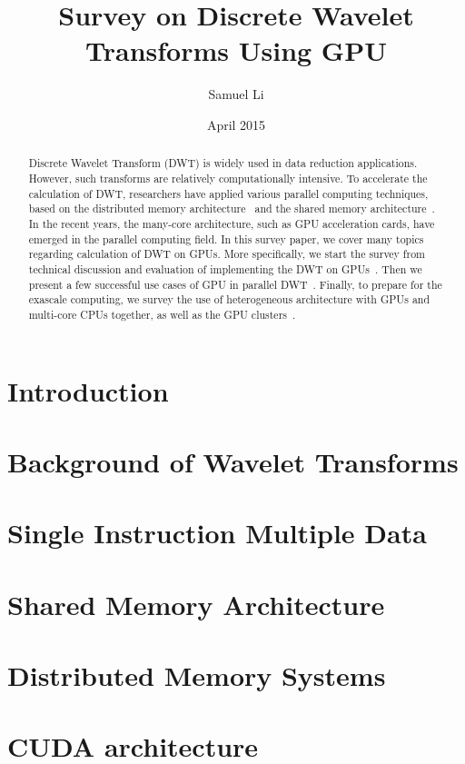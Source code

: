 \documentclass{article}
\title{Survey on Discrete Wavelet Transforms Using GPU}
\author{Samuel Li}
\date{April 2015}
\begin{document}
\onehalfspacing

\maketitle

\begin{abstract}
Discrete Wavelet Transform (DWT) is widely used in data reduction applications.
%
However, such transforms are relatively computationally intensive.
%
To accelerate the calculation of DWT, researchers have applied various parallel
computing techniques, based on the distributed memory architecture~\cite{
chadha2002scalable, nielsen1997scalable}
and the shared memory architecture~\cite{
kutil1999hardware,lucka2000parallel}.
%
In the recent years, the many-core architecture, such as GPU acceleration 
cards, have emerged in the parallel computing field.
%
In this survey paper, we cover many topics regarding calculation of DWT on GPUs.
%
More specifically, we start the survey from technical discussion and evaluation
of implementing the DWT on GPUs~\cite{tenllado2008parallel, van2011accelerating,
garcia2005gpu}.
%
Then we present a few successful use cases of GPU in parallel DWT~\cite{
strengert2004hierarchical, strengert2006pyramid, wong2007discrete,
treib2012turbulence}.
%
Finally, to prepare for the exascale computing, we survey the use of 
heterogeneous architecture with GPUs and multi-core CPUs together,
as well as the GPU clusters~\cite{franco2009parallel, franco2010parallel,
strengert2005large, franco20122d, rossinelli2011multicore}.
%
\end{abstract}

\section{Introduction}

\section{Background of Wavelet Transforms}

\label{sec:bg}

\section{Single Instruction Multiple Data}

\label{sec:simd}

\section{Shared Memory Architecture}

\label{sec:sma}

\section{Distributed Memory Systems}

\label{sec:dma}

\section{CUDA architecture}

\label{sec:cuda}

 
%

\end{document}
